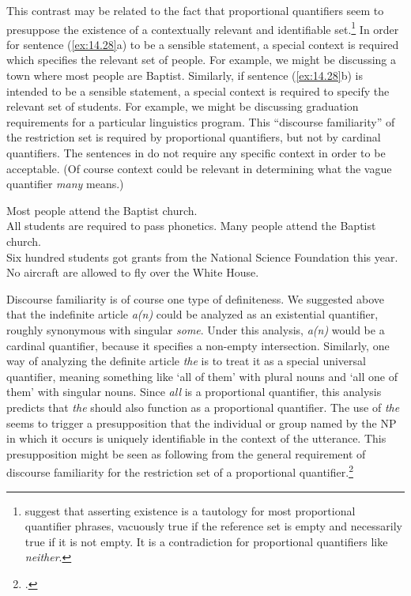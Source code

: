 \ea \label{ex:14.27}
\z
\z


This contrast may be related to the fact that proportional quantifiers seem to presuppose the existence of a contextually relevant and identifiable set.\footnote{\citet{BarwiseCooper1981} suggest that asserting existence is a tautology for most proportional quantifier phrases, vacuously true if the reference set is empty and necessarily true if it is not empty. It is a contradiction for proportional quantifiers like \textit{neither}.} In order for sentence (\ref{ex:14.28}a) to be a sensible statement, a special context is required which specifies the relevant set of people. For example, we might be discussing a town where most people are Baptist. Similarly, if sentence (\ref{ex:14.28}b) is intended to be a sensible statement, a special context is required to specify the relevant set of students. For example, we might be discussing graduation requirements for a particular linguistics program. This “discourse familiarity” of the restriction set is required by proportional quantifiers, but not by cardinal quantifiers. The sentences in  do not require any specific context in order to be acceptable. (Of course context could be relevant in determining what the vague quantifier \textit{many} means.)


\ea \label{ex:14.28}
\ea Most people attend the Baptist church.\\
\ex All students are required to pass phonetics.
\z
\ex \label{ex:14.29}
\ea Many people attend the Baptist church.\\
\ex Six hundred students got grants from the National Science Foundation this year.\\
\ex No aircraft are allowed to fly over the White House.
                       \z
\z


Discourse familiarity is of course one type of definiteness. We suggested above that the indefinite article \textit{a(n)} could be analyzed as an existential quantifier, roughly synonymous with singular \textit{some}. Under this analysis, \textit{a(n)} would be a cardinal quantifier, because it specifies a non-empty intersection. Similarly, one way of analyzing the definite article \textit{the} is to treat it as a special universal quantifier, meaning something like ‘all of them’ with plural nouns and ‘all one of them’ with singular nouns. Since \textit{all} is a proportional quantifier, this analysis predicts that \textit{the} should also function as a proportional quantifier. The use of \textit{the} seems to trigger a presupposition that the individual or group named by the NP in which it occurs is uniquely identifiable in the context of the utterance. This presupposition might be seen as following from the general requirement of discourse familiarity for the restriction set of a proportional quantifier.\footnote{\citet{Kearns2000}.}



